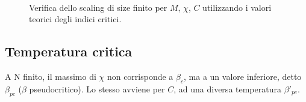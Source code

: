 \documentclass[a4paper,11pt]{article}
\begin{document}
	\begin{figure}
         \\
        \caption{Verifica dello scaling di size finito per $M$, $\chi$, $C$ utilizzando i valori teorici degli indici critici.}
        \label{fig:mchiC_scaling_plot}
	\end{figure}

	
	\subsection{Temperatura critica}
	
    A N finito, il massimo di $\chi$ non corrisponde a $\beta_c$, ma a un valore inferiore, detto $\beta_{pc}$ ($\beta$ pseudocritico). Lo stesso avviene per $C$, ad una diversa temperatura $\beta'_{pc}$.
    
\end{document}
